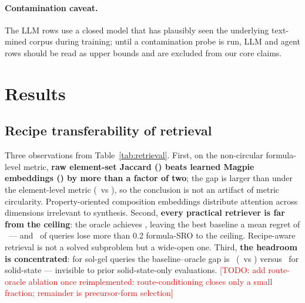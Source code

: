 \documentclass[10pt]{article}
\newcommand{\todo}[1]{\textcolor{red}{[TODO: #1]}}
\begin{document}
\paragraph{Contamination caveat.} The LLM rows use a closed model that has
plausibly seen the underlying text-mined corpus during training; until a
contamination probe is run, LLM and agent rows should be read as
upper bounds and are excluded from our core claims.

\section{Results}
\label{sec:results}

\subsection{Recipe transferability of retrieval}

\begin{table}[t]
  \centering
  \caption{Transferability benchmark: formula-SRO@5 (primary metric,
  mean [95\% CI]) with element-SRO@5 for continuity, method consistency,
  and latency; $n=\nRetrievalQueries$ queries, corpus \corpusSize\
  materials. Every retriever is bounded below by the random floor and
  above by the oracle ceiling.}
  \label{tab:retrieval}
  
\end{table}

Three observations from Table~\ref{tab:retrieval}. First, on the
non-circular formula-level metric, \textbf{raw element-set Jaccard
(\jaccFormulaSro) beats learned Magpie embeddings (\magpieFormulaSro) by
more than a factor of two}; the gap is larger than under the element-level
metric (\jaccElementSro\ vs \magpieElementSro), so the conclusion is not
an artifact of metric circularity. Property-oriented composition
embeddings distribute attention across dimensions irrelevant to synthesis.
Second, \textbf{every practical retriever is far from the ceiling}: the
oracle achieves \oracleFormulaSro, leaving the best baseline a mean regret
of \jaccMeanRegret\ --- and \jaccFracLargeRegret\ of queries lose more
than 0.2 formula-SRO to the ceiling. Recipe-aware retrieval is not a
solved subproblem but a wide-open one. Third, \textbf{the headroom is
concentrated}: for sol-gel queries the baseline--oracle gap is
\gapSolGel\ (\jaccSolGelFormulaSro\ vs \oracleSolGelFormulaSro) versus
\gapSolidState\ for solid-state --- invisible to prior solid-state-only
evaluations. \todo{add route-oracle ablation once reimplemented:
route-conditioning closes only a small fraction; remainder is
precursor-form selection}
\end{document}
